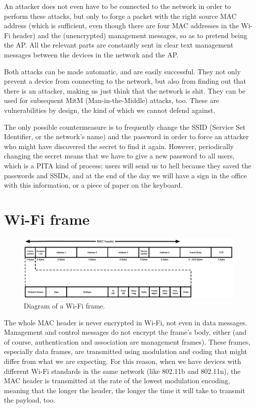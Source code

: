 An attacker does not even have to be connected to the network in order to perform these attacks, but only to forge a packet with the right source MAC address (which is sufficient, even though there are four MAC addresses in the Wi-Fi header) and the (unencrypted) management messages, so as to pretend being the AP. All the relevant parts are constantly sent in clear text management messages between the devices in the network and the AP.

Both attacks can be made automatic, and are easily successful. They not only prevent a device from connecting to the network, but also from finding out that there is an attacker, making us just think that the network is shit. They can be used for subsequent MitM (Man-in-the-Middle) attacks, too. These are vulnerabilities by design, the kind of which we cannot defend against.

The only possible countermeasure is to frequently change the SSID (Service Set Identifier, or the network's name) and the password in order to force an attacker who might have discovered the secret to find it again. However, periodically changing the secret means that we have to give a new password to all users, which is a PITA kind of process: users will send us to hell because they saved the passwords and SSIDs, and at the end of the day we will have a sign in the office with this information, or a piece of paper on the keyboard.


\section{Wi-Fi frame}
\begin{figure}[h]
    \centering
    \includegraphics[scale=0.5]{img/wifi_frame.png}
    \decoRule
    \caption{Diagram of a Wi-Fi frame.}
    \label{fig:wifi_frame}
\end{figure}

The whole MAC header is never encrypted in Wi-Fi, not even in data messages. Management and control messages do not encrypt the frame's body, either (and of course, authentication and association are management frames). These frames, especially data frames, are transmitted using modulation and coding that might differ from what we are expecting. For this reason, when we have devices with different Wi-Fi standards in the same network (like 802.11b and 802.11n), the MAC header is transmitted at the rate of the lowest modulation encoding, meaning that the longer the header, the longer the time it will take to transmit the payload, too.

